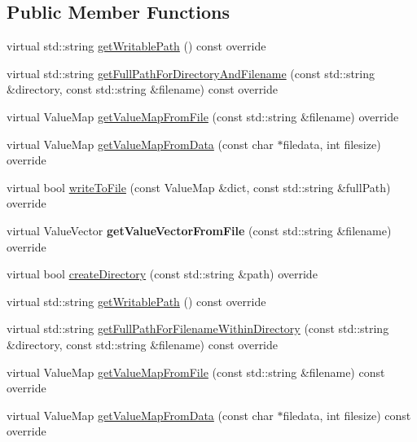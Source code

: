 \subsection*{Public Member Functions}
\begin{DoxyCompactItemize}
\item 
virtual std\+::string \hyperlink{classFileUtilsApple_ab88aca64f02b23087542ed28f1ad43d8}{get\+Writable\+Path} () const override
\item 
virtual std\+::string \hyperlink{classFileUtilsApple_aebc8f6fdf63b084f39ab0500b179368a}{get\+Full\+Path\+For\+Directory\+And\+Filename} (const std\+::string \&directory, const std\+::string \&filename) const override
\item 
virtual Value\+Map \hyperlink{classFileUtilsApple_a29093cea02fd4a89629ffb087e0f480b}{get\+Value\+Map\+From\+File} (const std\+::string \&filename) override
\item 
virtual Value\+Map \hyperlink{classFileUtilsApple_aa692d9cc3bb1a5b913fd5ce5dee0a548}{get\+Value\+Map\+From\+Data} (const char $\ast$filedata, int filesize) override
\item 
virtual bool \hyperlink{classFileUtilsApple_a57fe37f168814e2f6911fff52f7626c0}{write\+To\+File} (const Value\+Map \&dict, const std\+::string \&full\+Path) override
\item 
\mbox{\label{classFileUtilsApple_acf77dba43a16dbeff5dd02136b0c87ba}} 
virtual Value\+Vector {\bfseries get\+Value\+Vector\+From\+File} (const std\+::string \&filename) override
\item 
virtual bool \hyperlink{classFileUtilsApple_a2b55deedf8b0fda7ceec1442f3944b1e}{create\+Directory} (const std\+::string \&path) override
\item 
virtual std\+::string \hyperlink{classFileUtilsApple_a595858371ceb723ab608f535f8a2c454}{get\+Writable\+Path} () const override
\item 
virtual std\+::string \hyperlink{classFileUtilsApple_aa05388c597ff89171e955808338de05e}{get\+Full\+Path\+For\+Filename\+Within\+Directory} (const std\+::string \&directory, const std\+::string \&filename) const override
\item 
virtual Value\+Map \hyperlink{classFileUtilsApple_a400898c9e5777199a45372e98f1c6e0c}{get\+Value\+Map\+From\+File} (const std\+::string \&filename) const override
\item 
virtual Value\+Map \hyperlink{classFileUtilsApple_a5ecaabfb986144039b4adb55ac463f95}{get\+Value\+Map\+From\+Data} (const char $\ast$filedata, int filesize) const override

\end{DoxyCompactItemize}
